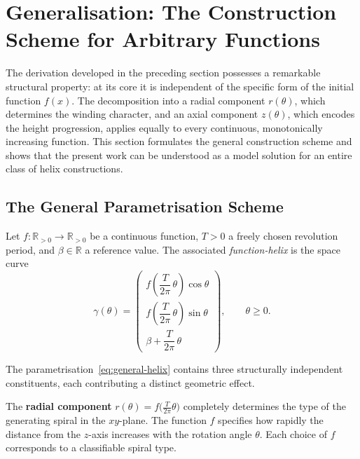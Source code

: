 \section{Generalisation: The Construction Scheme for Arbitrary Functions}

The derivation developed in the preceding section possesses a remarkable
structural property: at its core it is independent of the specific form
of the initial function $f(x)$. The decomposition into a radial
component $r(\theta)$, which determines the winding character, and an
axial component $z(\theta)$, which encodes the height progression,
applies equally to every continuous, monotonically increasing function.
This section formulates the general construction scheme and shows that
the present work can be understood as a model solution for an entire
class of helix constructions.

\subsection{The General Parametrisation Scheme}

\begin{definition}\label{def:function-helix}
Let $f: \mathbb{R}_{>0} \to \mathbb{R}_{>0}$ be a continuous function,
$T > 0$ a freely chosen revolution period, and $\beta \in \mathbb{R}$
a reference value. The associated \emph{function-helix} is the space
curve
\begin{equation}
\label{eq:general-helix}
\gamma(\theta)
=
\begin{pmatrix}
f\!\left(\dfrac{T}{2\pi}\,\theta\right)\cos\theta\\[8pt]
f\!\left(\dfrac{T}{2\pi}\,\theta\right)\sin\theta\\[8pt]
\beta + \dfrac{T}{2\pi}\,\theta
\end{pmatrix},
\qquad \theta \geq 0.
\end{equation}
\end{definition}

The parametrisation~\eqref{eq:general-helix} contains three structurally
independent constituents, each contributing a distinct geometric effect.

The \textbf{radial component}
$r(\theta) = f\!\bigl(\tfrac{T}{2\pi}\theta\bigr)$ completely determines
the type of the generating spiral in the $xy$-plane. The function $f$
specifies how rapidly the distance from the $z$-axis increases with the
rotation angle $\theta$. Each choice of $f$ corresponds to a classifiable
spiral type.


